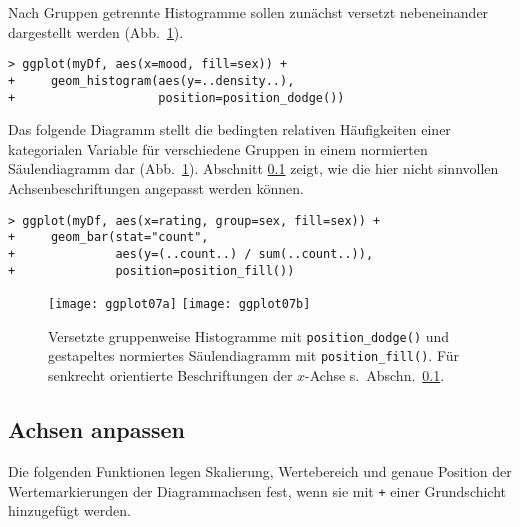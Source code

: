 Nach Gruppen getrennte Histogramme sollen zunächst versetzt nebeneinander dargestellt werden (Abb.\ \ref{fig:ggplot07}).
\begin{lstlisting}
> ggplot(myDf, aes(x=mood, fill=sex)) +
+     geom_histogram(aes(y=..density..),
+                    position=position_dodge())
\end{lstlisting}

Das folgende Diagramm stellt die bedingten relativen Häufigkeiten einer kategorialen Variable für verschiedene Gruppen in einem normierten Säulendiagramm dar (Abb.\ \ref{fig:ggplot07}). Abschnitt \ref{sec:ggplotAxis} zeigt, wie die hier nicht sinnvollen Achsenbeschriftungen angepasst werden können.
\begin{lstlisting}
> ggplot(myDf, aes(x=rating, group=sex, fill=sex)) +
+     geom_bar(stat="count",
+              aes(y=(..count..) / sum(..count..)),
+              position=position_fill())
\end{lstlisting}

\begin{figure}[ht]
\centering
\texttt{[image: ggplot07a]}
\texttt{[image: ggplot07b]}
\vspace*{-0.5em}
\caption{Versetzte gruppenweise Histogramme mit \lstinline!position_dodge()! und gestapeltes normiertes Säulendiagramm mit \lstinline!position_fill()!. Für senkrecht orientierte Beschriftungen der $x$-Achse s.\ Abschn.\ \ref{sec:ggplotAxis}.}
\label{fig:ggplot07}
\end{figure}

\subsection{Achsen anpassen}
\label{sec:ggplotAxis}

Die folgenden Funktionen legen Skalierung, Wertebereich und genaue Position der Wertemarkierungen der Diagrammachsen fest, wenn sie mit \lstinline!+! einer Grundschicht hinzugefügt werden.

